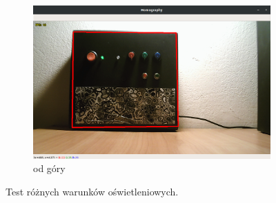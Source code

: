 \documentclass[12pt,twoside,polish]{article}
\begin{document}
\begin{figure}[htb!]
\begin{subfigure}{0.46\textwidth}
		\includegraphics[width=\textwidth]{test_light3}
		\caption{od góry}
		\label{test_light3}
	\end{subfigure}
	\caption{Test różnych warunków oświetleniowych.}
\end{figure}
\FloatBarrier
\end{document}
